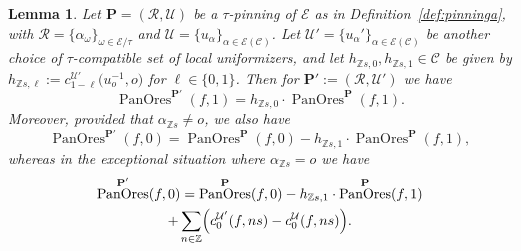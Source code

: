 \documentclass[preprint,12pt]{elsarticle}
\numberwithin{equation}{section} %
\theoremstyle{theorem}
\newtheorem{lemma}[theorem]{Lemma}
\theoremstyle{definition}
\newcommand{\Ca}{\mathcal{C}} %
\newcommand{\ec}{\mathcal{E}} %
\newcommand{\idec}{{o}} %
\newcommand{\orbita}{{\ec/\tau}} %
\newcommand{\Z}{\mathbb{Z}} %
\DeclareMathOperator{\pano}{PanOres}
\begin{document}
\begin{lemma}\label{lem:pano-pinning-au} Let $\mathbf{P}=(\mathcal{R},\mathcal{U})$ be a $\tau$-pinning of $\ec$ as in Definition~\ref{def:pinninga}, with $\mathcal{R}=\{\alpha_\omega\}_{\omega\in\orbita}$ and $\mathcal{U}=\{u_\alpha\}_{\alpha\in\ec(\Ca)}$. Let $\mathcal{U}'=\{u_\alpha'\}_{\alpha\in\ec(\Ca)}$ be another choice of $\tau$-compatible set of local uniformizers, and let $h_{\Z s,0},h_{\Z s,1}\in\Ca$ be given by $h_{\Z s,\ell}:=c^{\mathcal{U}'}_{1-\ell}\bigl(u_\idec^{-1},\idec\bigr)$ for $\ell\in\{0,1\}$. Then for $\mathbf{P}':=(\mathcal{R},\mathcal{U}')$ we have
\begin{equation}\label{eq:pano-pinning-au1}
    \pano^{\mathbf{P}'}(f,1) =h_{\Z s,0}\cdot \pano^\mathbf{P}(f,1).\end{equation}Moreover, provided that $\alpha_{\Z s}\neq\idec$, we also have
    \begin{equation}
    \pano^{\mathbf{P}'}(f,0) =\pano^\mathbf{P}(f,0)-h_{\Z s,1}\cdot\pano^\mathbf{P}(f,1),\label{eq:pano-pinning-au0-nice}\end{equation}whereas in the exceptional situation where $\alpha_{\Z s}=\idec$ we have
    \begin{multline}\label{eq:pano-pinning-au0-mean}
    \pano^{\mathbf{P}'}(f,0) =\pano^\mathbf{P}(f,0)-h_{\Z s,1}\cdot\pano^\mathbf{P}(f,1)\\ +\sum_{n\in\Z}\Bigl(c^{\mathcal{U}'}_0(f,ns)-c^{\mathcal{U}}_0(f,ns)\Bigr).
\end{multline}
\end{lemma}
\end{document}

